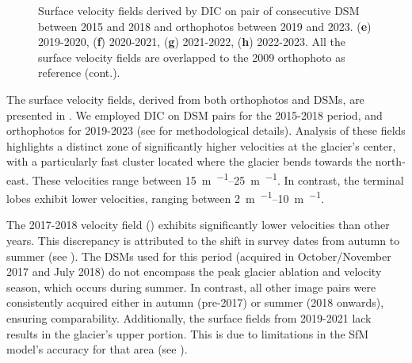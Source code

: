 \begin{figure}[!p]
{    } 
    \caption{Surface velocity fields derived by DIC on pair of consecutive DSM between 2015 and 2018 and 
    orthophotos between 2019 and 2023. (\textbf{e}) 2019-2020, (\textbf{f}) 2020-2021, (\textbf{g}) 2021-2022, (\textbf{h}) 2022-2023.
    All the surface velocity fields are overlapped to the 2009 orthophoto \citep{Degaetani2021} as reference (cont.).}
\end{figure}

The surface velocity fields, derived from both orthophotos and DSMs, are presented in . 
We employed DIC on DSM pairs for the 2015-2018 period, and orthophotos for 2019-2023 (see  for methodological details). 
Analysis of these fields highlights a distinct zone of significantly higher velocities at the glacier's center,
with a particularly fast cluster located where the glacier bends towards the north-east. 
These velocities range between \SIrange{15}{25}{\meter\per\year}. 
In contrast, the terminal lobes exhibit lower velocities, ranging between \SIrange{2}{10}{\meter\per\year}.

The 2017-2018 velocity field () exhibits significantly lower velocities than other years. 
This discrepancy is attributed to the shift in survey dates from autumn to summer (see ). 
The DSMs used for this period (acquired in October/November 2017 and July 2018) do not encompass the peak glacier ablation 
and velocity season, which occurs during summer. 
In contrast, all other image pairs were consistently acquired either in autumn (pre-2017) or summer (2018 onwards), 
ensuring comparability.  
Additionally, the surface fields from 2019-2021 lack results in the glacier's upper portion. 
This is due to limitations in the SfM model's accuracy for that area (see ).

